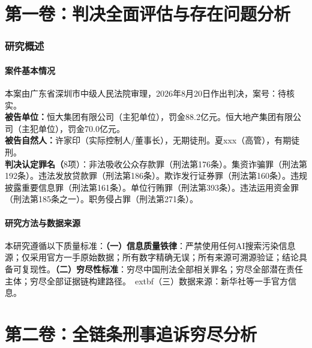 \documentclass[11pt,a4paper,oneside]{article}
\begin{document}
\part{第一卷：判决全面评估与存在问题分析}\section{研究概述}\subsection{案件基本情况}本案由广东省深圳市中级人民法院审理，2026年8月20日作出判决，案号：待核实。\\\textbf{被告单位：}恒大集团有限公司（主犯单位），罚金88.2亿元。恒大地产集团有限公司（主犯单位），罚金70.0亿元。\\\textbf{被告自然人：}许家印（实际控制人/董事长），无期徒刑。夏xxx（高管），有期徒刑。\\\textbf{判决认定罪名（}8项）：非法吸收公众存款罪（刑法第176条）。集资诈骗罪（刑法第192条）。违法发放贷款罪（刑法第186条）。欺诈发行证券罪（刑法第160条）。违规披露重要信息罪（刑法第161条）。单位行贿罪（刑法第393条）。违法运用资金罪（刑法第185条之一）。职务侵占罪（刑法第271条）。\subsection{研究方法与数据来源}
本研究遵循以下质量标准：\textbf{（一）信息质量铁律}：严禁使用任何AI搜索污染信息源；仅采用官方一手原始数据；所有数字精确无误；所有来源可溯源验证；结论具备可复现性。\textbf{（二）穷尽性标准}：穷尽中国刑法全部相关罪名；穷尽全部潜在责任主体；穷尽全部证据链构建路径。\	extbf{（三）数据来源}：新华社等一手官方信息。\part{第二卷：全链条刑事追诉穷尽分析}
\end{document}
